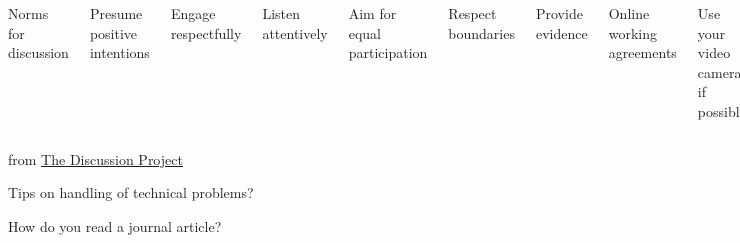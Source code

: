 \documentclass[aspectratio=169,12pt,t]{beamer}
\begin{document}
\begin{frame}{}

  \begin{columns}

      \centerline{\color{title} Norms for discussion}

      \bigskip

      {\footnotesize
      \bi
    \item Presume positive intentions
    \item Engage respectfully
    \item Listen attentively
    \item Aim for equal participation
    \item Respect boundaries
    \item Provide evidence
      \ei }



      \centerline{\color{title} Online working agreements}

      \bigskip

      \footnotesize

      \bi
    \item Use your video camera if possible
    \item Use names to address each other
    \item Use features (mute, raise hand, chat, etc) appropriately
    \item Be okay with silence
    \item Start and end on time
      \ei

  \end{columns}

\bigskip \bigskip \bigskip
\bigskip \bigskip \bigskip

\hfill {\scriptsize from \href{https://discussion.education.wisc.edu}{The Discussion Project}}

\end{frame}



\begin{frame}{Tips on handling of technical problems?}

\end{frame}




\begin{frame}[c]{}

\centerline{\Large \color{title} How do you read a journal article?}

\end{frame}
\end{document}
